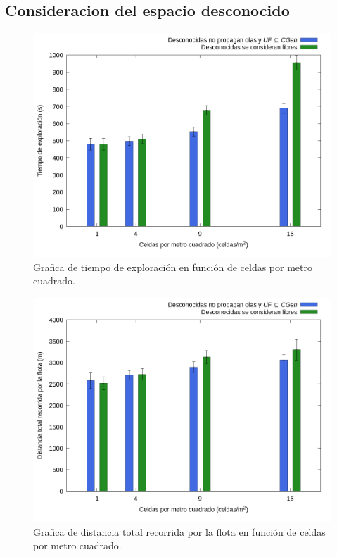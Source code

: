 \subsection{Consideracion del espacio desconocido}\label{sec:exp:desco}





\begin{figure}[H]
  \centerfloat

  \includegraphics[clip=true, width=\graphlen]{imagenes/graficas_chicas/graficas_histo_num/desconocido/exploration_time.png}

  \caption{Grafica de tiempo de exploración en función de celdas por metro cuadrado.}\label{fig:gra:des:et}

\end{figure}

\begin{figure}[H]
  \centerfloat

  \includegraphics[clip=true, width=\graphlen]{imagenes/graficas_chicas/graficas_histo_num/desconocido/exploration_cost.png}

  \caption{Grafica de distancia total recorrida por la flota en función de celdas por metro cuadrado.}\label{fig:gra:des:ec}

\end{figure}

